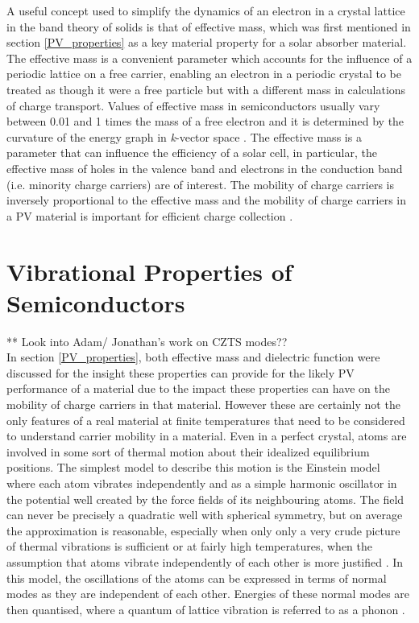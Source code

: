A useful concept used to simplify the dynamics of an electron in a crystal lattice in the band theory of solids is that of effective mass, which was first mentioned in section \ref{PV_properties} as a key material property for a solar absorber material. The effective mass is a convenient parameter which accounts for the influence of a periodic lattice on a free carrier, enabling an electron in a periodic crystal to be treated as though it were a free particle but with a different mass in calculations of charge transport. Values of effective mass in semiconductors usually vary between 0.01 and 1 times the mass of a free electron and it is determined by the curvature of the energy graph in \textit{k}-vector space \cite{small_semiconductor2}. The effective mass is a parameter that can influence the efficiency of a solar cell, in particular, the effective mass of holes in the valence band and electrons in the conduction band (i.e. minority charge carriers) are of interest. The mobility of charge carriers is inversely proportional to the effective mass and the mobility of charge carriers in a PV material is important for efficient charge collection \cite{transport}.
 
 
 \section{Vibrational Properties of Semiconductors}
 
 ** Look into Adam/ Jonathan's work on CZTS modes??\\
 
In section \ref{PV_properties}, both effective mass and dielectric function were discussed for the insight these properties can provide for the likely PV performance of a material due to the impact these properties can have on the mobility of charge carriers in that material. However these are certainly not the only features of a real material at finite temperatures that need to be considered to understand carrier mobility in a material. 
Even in a perfect crystal, atoms are involved in some sort of thermal motion about their idealized equilibrium positions. The simplest model to describe this motion is the Einstein model where each atom vibrates independently and as a simple harmonic oscillator in the potential well created by the force fields of its neighbouring atoms. The field can never be precisely a quadratic well with spherical symmetry, but on average the approximation is reasonable, especially when only only a very crude picture of thermal vibrations is sufficient or at fairly high temperatures, when the assumption that atoms vibrate independently of each other is more justified \cite{Ziman_solids}. In this model, the oscillations of the atoms can be expressed in terms of normal modes as they are independent of each other. Energies of these normal modes are then quantised, where a quantum of lattice vibration is referred to as a phonon \cite{fund_semi}.\\

